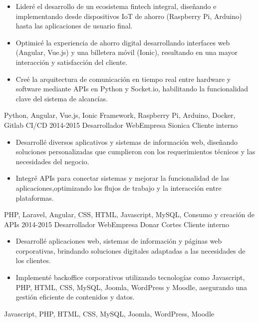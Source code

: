 \begin{experiences}
{          \begin{itemize}
              \item Lideré el desarrollo de un ecosistema fintech integral, diseñando e implementando desde dispositivos IoT de ahorro (Raspberry Pi, Arduino) hasta las aplicaciones de usuario final.
              \item Optimicé la experiencia de ahorro digital desarrollando interfaces web (Angular, Vue.js) y una billetera móvil (Ionic), resultando en una mayor interacción y satisfacción del cliente.
              \item Creé la arquitectura de comunicación en tiempo real entre hardware y software mediante APIs en Python y Socket.io, habilitando la funcionalidad clave del sistema de alcancías.
            \end{itemize}
        }
        {
          Python, Angular, Vue.js, Ionic Framework, Raspberry Pi, Arduino, Docker, Gitlab CI/CD
        }
  \emptySeparator
  \experience
    {2014-2015} {Desarrollador Web}{Empresa Sionica} {Cliente interno}
    {} {
        \begin{itemize}
          \item Desarrollé diversos aplicativos y sistemas de información web, diseñando soluciones personalizadas que cumplieron con los requerimientos técnicos y las necesidades del negocio.
          \item Integré APIs para conectar sistemas y mejorar la funcionalidad de las aplicaciones,optimizando los flujos de trabajo y la interacción entre plataformas.
        \end{itemize}
      }
      {PHP, Laravel, Angular, CSS, HTML, Javascript, MySQL, Consumo y creación de APIs}
  \emptySeparator
  \experience
    {2014-2015} {Desarrollador Web}{Empresa Donar Cortes} {Cliente interno}
    {} {
        \begin{itemize}
          \item Desarrollé aplicaciones web, sistemas de información y páginas web corporativas, brindando soluciones digitales adaptadas a las necesidades de los clientes.
          \item Implementé backoffice corporativos utilizando tecnologías como Javascript, PHP, HTML, CSS, MySQL, Joomla, WordPress y Moodle, asegurando una gestión eficiente de contenidos y datos.
        \end{itemize}
      }
      {Javascript, PHP, HTML, CSS, MySQL, Joomla, WordPress, Moodle}
  \emptySeparator


\end{experiences}
